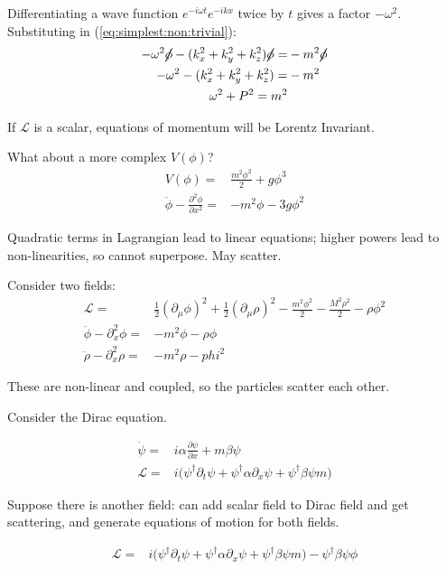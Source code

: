 \documentclass[]{article}
\begin{document}
Differentiating a wave function $e^{-i \omega t} e^{-i k x}$ twice by $t$ gives a factor $-\omega^2$. Substituting in (\ref{eq:simplest:non:trivial}):
\begin{align*}
-\omega^2 \cancel{\phi} - (k_x^2+k_y^2+k_z^2)\cancel{\phi} =& -m^2 \cancel{\phi}\\
-\omega^2  - (k_x^2+k_y^2+k_z^2) =& -m^2 \\
\omega^2 + P^2 = m^2
\end{align*}

If $\mathcal{L}$ is a scalar, equations of momentum will be Lorentz Invariant.

What about a more complex $V(\phi)$?
\begin{align*}
	V(\phi) =& \frac{m^2 \phi^2}{2} + g \phi^3\\
	\ddot{\phi} - \frac{\partial^2 \phi}{\partial x^2}  =& - m^2 \phi - 3 g \phi^2
\end{align*}

Quadratic terms in Lagrangian lead to linear equations; higher powers lead to non-linearities, so cannot superpose. May scatter.

Consider two fields:
\begin{align*}
	\mathcal{L} =& \frac{1}{2}(\partial_{\mu} \phi)^2 + \frac{1}{2}(\partial_{\mu} \rho)^2 - \frac{m^2 \phi^2}{2} - \frac{M^2 \rho^2}{2} - \rho \phi^2\\
	\ddot{\phi} - \partial_x^2 \phi =& -m^2 \phi - \rho \phi
	\\
	\ddot{\rho} - \partial_x^2 \rho =& -m^2 \rho -phi^2
\end{align*}

These are non-linear and coupled, so the particles scatter each other.

Consider the Dirac equation.

\begin{align*}
\dot{\psi} =& i \alpha \frac{\partial \psi}{\partial x} + m \beta \psi\\
\mathcal{L} =& i \big( \psi^\dagger \partial_t \psi +  \psi^\dagger \alpha \partial_x \psi + \psi^\dagger \beta \psi m \big)
\end{align*}

Suppose there is another field: can add scalar field to Dirac field and get scattering, and generate equations of motion for both fields.

\begin{align*}
\mathcal{L} =& i \big( \psi^\dagger \partial_t \psi +  \psi^\dagger \alpha \partial_x \psi + \psi^\dagger \beta \psi m \big) - \psi^\dagger \beta \psi \phi
\end{align*}
\end{document}
